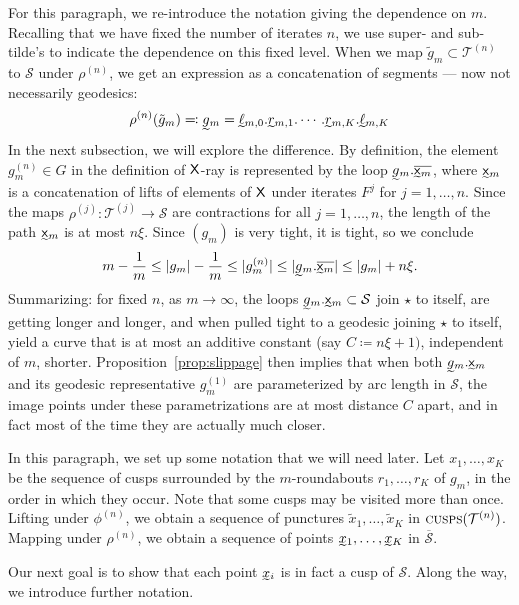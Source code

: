 \documentclass{amsart}
\theoremstyle{definition}
\theoremstyle{remark}
\newcommand{\sfX}{{\sf X}}
\newcommand{\sfx}{{\sf x}}
\newcommand{\cT}{\mathcal{T}}
\newcommand{\cS}{\mathcal{S}}
\newcommand{\cusps}[1]{\text{\sc cusps}(#1)}
\begin{document}
 For this paragraph, we re-introduce the notation giving the dependence on $m$.  Recalling that we have fixed the number of iterates $n$, we use super- and sub-tilde's to indicate the dependence on this fixed level. When we map $\tilde{g}_m \subset \cT^{(n)}$ to $\cS$ under $\rho^{(n)}$, we get an expression as a concatenation of segments --- now not necessarily geodesics:
 \[ \rho^{(n)}(\tilde{g}_m)\eqqcolon\undertilde{g}_m=\undertilde{\ell}_{m,0} . \undertilde{r}_{m,1} . \cdots . \undertilde{r}_{m,K} . \undertilde{\ell}_{m,K}\] 
In the next subsection, we will explore the difference. By definition, the element $g_m^{(n)}\in G$ in the definition of $\sfX$-ray is represented by the loop $\undertilde{g}_m.\overline{\undertilde{\sfx}_m}$, where $\undertilde{\sfx}_m$ is a concatenation of lifts of elements of $\sfX$ under iterates $F^{j}$ for $j=1,\ldots, n$.  Since the maps $\rho^{(j)}\colon \cT^{(j)}\to\cS$ are contractions for all $j=1,\ldots, n$,  the length of the path $\undertilde{\sfx}_m$ is at most $n\xi$.  Since $(g_m)$ is very tight, it is tight, so we conclude 
\begin{equation}\label{eq:nth}
m-\frac{1}{m} \leq |g_m|-\frac{1}{m} \leq |g_m^{(n)}| \leq |\undertilde{g}_m.\overline{\undertilde{\sfx}_m}| \leq |g_m|+n\xi.
\end{equation}
Summarizing: for fixed $n$, as $m\to\infty$, the loops $\undertilde{g}_m.\undertilde{\sfx}_m\subset \cS$ join $\star$ to itself, are getting longer and longer, and when pulled tight to a geodesic joining $\star$ to itself, yield a curve that is at most an additive constant (say $C\coloneqq n\xi + 1)$, independent of $m$, shorter. Proposition~\ref{prop:slippage} then implies that when both $\undertilde{g}_m.\undertilde{\sfx}_m$ and its geodesic representative $g^{(1)}_m$ are parameterized by arc length in $\cS$, the image points under these parametrizations are at most distance $C$ apart, and in fact most of the time they are actually much closer. 

In this paragraph, we set up some notation that we will need later. Let $x_1,\ldots, x_K$ be the sequence of cusps surrounded by the $m$-roundabouts $r_1, \ldots, r_K$ of $g_m$, in the order in which they occur.  Note that some cusps may be visited more than once. Lifting under $\phi^{(n)}$, we obtain a sequence of punctures $\tilde{x}_1, \ldots, \tilde{x}_K$ in $\cusps{\cT^{(n)}}$.  Mapping under $\rho^{(n)}$, we obtain a sequence of points $\undertilde{x}_1, \ldots, \undertilde{x}_K$ in $\overline{\cS}$.  

Our next goal is to show that each point $\undertilde{x}_i$ is in fact a cusp of $\cS$.  Along the way, we introduce further notation.
\end{document}
